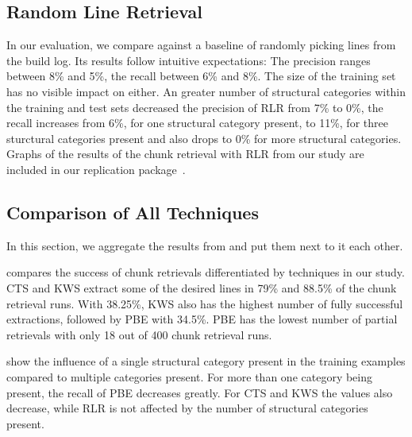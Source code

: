 \subsection{Random Line Retrieval}
\label{sec:r:rlr}

In our evaluation, we compare against a baseline of randomly
picking lines from the build log. Its results follow intuitive
expectations:
The precision ranges between 8\% and 5\%, the recall between 6\% and
8\%. The size of the training set has no visible impact on either.
An greater number of structural categories within the training and
test sets decreased the precision of RLR from 7\% to 0\%, the recall
increases from 6\%, for one structural category present, to 11\%, for
three sturctural categories present and also drops to 0\% for more
structural categories.
Graphs of the results of the chunk retrieval with RLR from our study
are included in our replication package~\cite{brandt2020chunk-replication}. 

\subsection{Comparison of All Techniques}
In this section, we aggregate the results from
 and put them next to it
each other.

 compares the success of chunk
retrievals differentiated by techniques in our study. CTS and KWS
extract some of the desired lines in 79\% and 88.5\% of the chunk
retrieval runs. With 38.25\%, KWS also has the highest number of fully
successful extractions, followed by PBE with 34.5\%. PBE has the
lowest number of partial retrievals with only 18 out of 400 chunk
retrieval runs.


show the influence of a single structural category present in the
training examples compared to multiple categories present. For more
than one category being present, the recall of PBE decreases greatly.
For CTS and KWS the values also decrease, while RLR is not affected by
the number of structural categories present.

